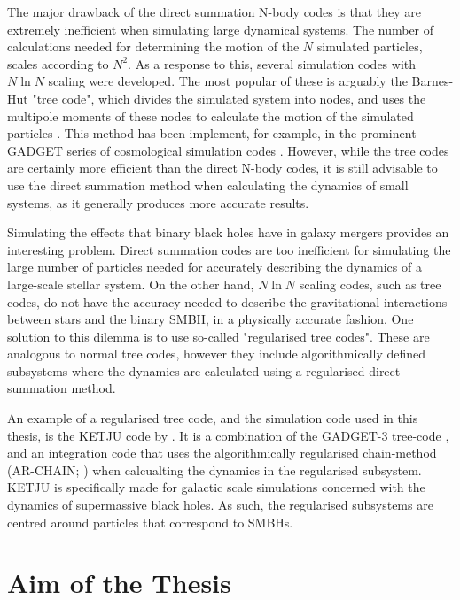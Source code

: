 \documentclass[english, twoside]{HYgradu}
\begin{document}
The major drawback of the direct summation N-body codes is that they are extremely inefficient when simulating large dynamical systems. The number of calculations needed for determining the motion of the $N$ simulated particles, scales according to $N^2$. As a response to this, several simulation codes with $N \ln N$ scaling were developed. The most popular of these is arguably the Barnes-Hut "tree code", which divides the simulated system into nodes, and uses the multipole moments of these nodes to calculate the motion of the simulated particles \citep{Barnes1986}. This method has been implement, for example, in the prominent GADGET series of cosmological simulation codes \citep{Springel2001}. However, while the tree codes are certainly more efficient than the direct N-body codes, it is still advisable to use the direct summation method when calculating the dynamics of small systems, as it generally produces more accurate results.

Simulating the effects that binary black holes have in galaxy mergers provides an interesting problem. Direct summation codes are too inefficient for simulating the large number of particles needed for accurately describing the dynamics of a large-scale stellar system. On the other hand, $N \ln N$ scaling codes, such as tree codes, do not have the accuracy needed to describe the gravitational interactions between stars and the binary SMBH, in a physically accurate fashion. One solution to this dilemma is to use so-called "regularised tree codes". These are analogous to normal tree codes, however they include algorithmically defined subsystems where the dynamics are calculated using a regularised direct summation method.

An example of a regularised tree code, and the simulation code used in this thesis, is the KETJU code by \cite{Rantala2017KETJU}. It is a combination of the GADGET-3 tree-code \citep{Springel2005}, and an integration code that uses the algorithmically regularised chain-method (AR-CHAIN; \citealt{Mikkola2008ARCHAIN}) when calcualting the dynamics in the regularised subsystem. KETJU is specifically made for galactic scale simulations concerned with the dynamics of supermassive black holes. As such, the regularised subsystems are centred around particles that correspond to SMBHs.

\section{Aim of the Thesis}
\end{document}
